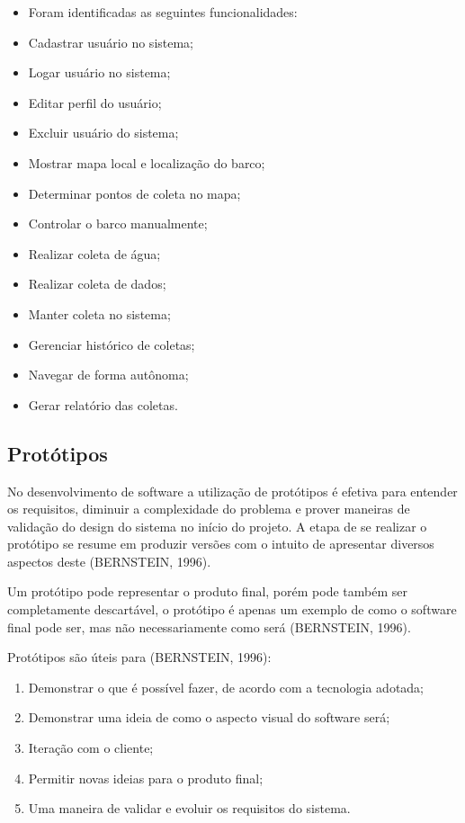 \begin{itemize}
    \item Foram identificadas as seguintes funcionalidades:
    \item Cadastrar usuário no sistema;
    \item Logar usuário no sistema;
    \item Editar perfil do usuário;
    \item Excluir usuário do sistema;
    \item Mostrar mapa local e localização do barco;
    \item Determinar pontos de coleta no mapa;
    \item Controlar o barco manualmente;
    \item Realizar coleta de água;
    \item Realizar coleta de dados;
    \item Manter coleta no sistema;
    \item Gerenciar histórico de coletas;
    \item Navegar de forma autônoma;
    \item Gerar relatório das coletas.
\end{itemize}

\subsection{Protótipos}

No desenvolvimento de software a utilização de protótipos é efetiva para entender os requisitos, diminuir a complexidade do  problema  e  prover  maneiras   de  validação  do  design  do  sistema  no  início  do projeto.  A  etapa  de  se  realizar  o  protótipo  se  resume  em  produzir versões    com o intuito de  apresentar    diversos    aspectos    deste (BERNSTEIN, 1996).

Um  protótipo  pode  representar  o  produto  final,  porém  pode  também  ser completamente  descartável,  o  protótipo  é  apenas  um  exemplo  de  como  o software final pode ser, mas não necessariamente como será (BERNSTEIN, 1996).

Protótipos são úteis para (BERNSTEIN, 1996):

\begin{enumerate}
    \item Demonstrar  o  que  é  possível  fazer,  de  acordo  com  a  tecnologia adotada;
    \item Demonstrar uma ideia de como o aspecto visual do software será;
    \item Iteração com o cliente;
    \item Permitir novas ideias para o produto final;
    \item Uma maneira de validar e evoluir os requisitos do sistema.
\end{enumerate}

